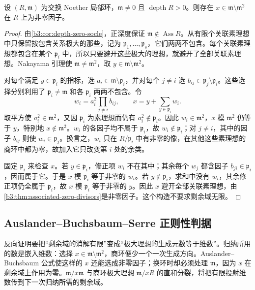 \begin{lemma}\label{b3:lem:linear-regular-element-choice}
	设 \((R,\mathfrak m)\) 为交换 Noether 局部环，\(\mathfrak m\ne0\) 且 \(\operatorname{depth}R>0\)。则存在 \(x\in\mathfrak m\setminus\mathfrak m^2\) 在 \(R\) 上为非零因子。
\end{lemma}
\begin{proof}
	由\cref{b3:cor:depth-zero-socle}，正深度保证 \(\mathfrak m\notin\operatorname{Ass}R\)。从有限个关联素理想中只保留按包含关系极大的那些，记为 \(\mathfrak p_1,\ldots,\mathfrak p_s\)，它们两两不包含。每个关联素理想都包含在某个 \(\mathfrak p_i\) 中，所以只要避开这些极大的理想，就避开了全部关联素理想。Nakayama 引理使 \(\mathfrak m\ne\mathfrak m^2\)，取 \(y\in\mathfrak m\setminus\mathfrak m^2\)。

	对每个满足 \(y\in\mathfrak p_i\) 的指标，选 \(a_i\in\mathfrak m\setminus\mathfrak p_i\)，并对每个 \(j\ne i\) 选 \(b_{ij}\in\mathfrak p_j\setminus\mathfrak p_i\)。这些选择分别利用了 \(\mathfrak p_i\ne\mathfrak m\) 和各 \(\mathfrak p_i\) 两两不包含。令
	\[
		w_i=a_i^2\prod_{j\ne i}b_{ij},\qquad x=y+\sum_{y\in\mathfrak p_i}w_i.
	\]
	取平方使 \(a_i^2\in\mathfrak m^2\)，又因 \(\mathfrak p_i\) 为素理想而仍有 \(a_i^2\notin\mathfrak p_i\)。因此 \(w_i\in\mathfrak m^2\)，\(x\) 模 \(\mathfrak m^2\) 仍等于 \(y\)，特别地 \(x\notin\mathfrak m^2\)。\(w_i\) 的各因子均不属于 \(\mathfrak p_i\)，故 \(w_i\notin\mathfrak p_i\)；对 \(j\ne i\)，其中的因子 \(b_{ij}\) 则使 \(w_i\in\mathfrak p_j\)。换言之，\(w_i\) 只在 \(R/\mathfrak p_i\) 中有非零的像，在其他这些素理想的商环中都为零，故加入它只改变第 \(i\) 处的余类。

	固定 \(\mathfrak p_i\) 来检查 \(x\)。若 \(y\in\mathfrak p_i\)，修正项 \(w_i\) 不在其中；其余每个 \(w_j\) 都含因子 \(b_{ji}\in\mathfrak p_i\)，因而属于它。于是 \(x\) 模 \(\mathfrak p_i\) 等于非零的 \(w_i\)。若 \(y\notin\mathfrak p_i\)，求和中没有 \(w_i\)，其余修正项仍全属于 \(\mathfrak p_i\)，故 \(x\) 模 \(\mathfrak p_i\) 等于非零的 \(y\)。因此 \(x\) 避开全部关联素理想，由\cref{b3:thm:associated-zero-divisors}是非零因子。这个构造不要求剩余域无限。
\end{proof}

\subsection{Auslander–Buchsbaum–Serre 正则性判据}
\label{b3:subsec:1802:02}

反向证明要把“剩余域的消解有限”变成“极大理想的生成元数等于维数”。归纳所用的数是嵌入维数：选择 \(x\in\mathfrak m\setminus\mathfrak m^2\)，商环便少一个一次生成方向。Auslander–Buchsbaum 公式使这样的 \(x\) 还能选成非零因子；换环时却必须处理 \(\mathfrak m\)，因为 \(x\) 在剩余域上作用为零。\(\mathfrak m/x\mathfrak m\) 与商环极大理想 \(\mathfrak m/xR\) 的直和分裂，将把有限投射维数传到下一次归纳所需的剩余域。

